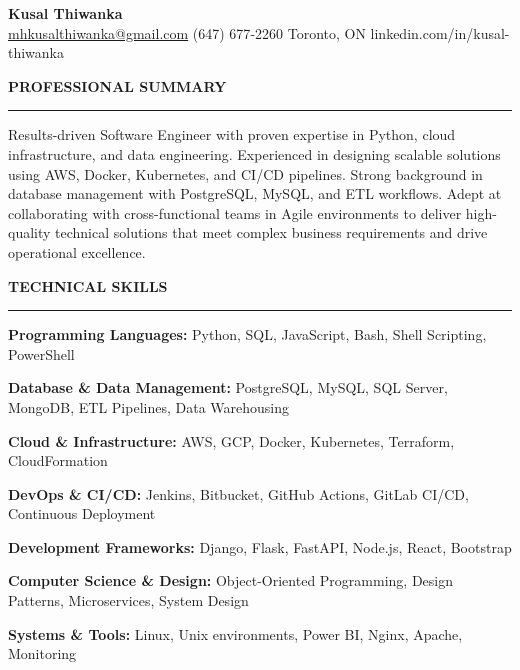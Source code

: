\documentclass[10pt,letterpaper]{article}
\begin{document}
\begin{center}
{\LARGE\textbf{Kusal Thiwanka}}\\[3pt]
\href{mailto:mhkusalthiwanka@gmail.com}{mhkusalthiwanka@gmail.com}\hspace{2em}%
(647) 677{-}2260\hspace{2em}%
Toronto, ON\hspace{2em}
linkedin.com/in/kusal-thiwanka
\end{center}

\vspace{6pt}

\textbf{PROFESSIONAL SUMMARY}\\[-8pt]
\noindent\rule{\textwidth}{1pt}

\vspace{-2pt}

Results-driven Software Engineer with proven expertise in Python, cloud infrastructure, and data engineering. Experienced in designing scalable solutions using AWS, Docker, Kubernetes, and CI/CD pipelines. Strong background in database management with PostgreSQL, MySQL, and ETL workflows. Adept at collaborating with cross-functional teams in Agile environments to deliver high-quality technical solutions that meet complex business requirements and drive operational excellence.

\vspace{8pt}

\textbf{TECHNICAL SKILLS}\\[-8pt]
\noindent\rule{\textwidth}{1pt}

\vspace{-2pt}

\textbf{Programming Languages:} Python, SQL, JavaScript, Bash, Shell Scripting, PowerShell

\textbf{Database \& Data Management:} PostgreSQL, MySQL, SQL Server, MongoDB, ETL Pipelines, Data Warehousing

\textbf{Cloud \& Infrastructure:} AWS, GCP, Docker, Kubernetes, Terraform, CloudFormation

\textbf{DevOps \& CI/CD:} Jenkins, Bitbucket, GitHub Actions, GitLab CI/CD, Continuous Deployment

\textbf{Development Frameworks:} Django, Flask, FastAPI, Node.js, React, Bootstrap

\textbf{Computer Science \& Design:} Object-Oriented Programming, Design Patterns, Microservices, System Design

\textbf{Systems \& Tools:} Linux, Unix environments, Power BI, Nginx, Apache, Monitoring
\end{document}
